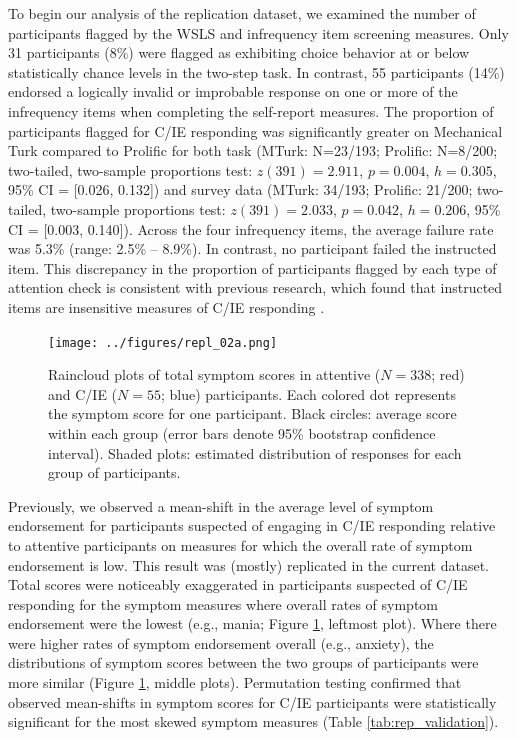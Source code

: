 \documentclass[a4paper,notitlepage,12pt]{article}
\begin{document}
\begin{refsection}[supp]
To begin our analysis of the replication dataset, we examined the number of participants flagged by the WSLS and infrequency item screening measures. Only 31 participants (8\%) were flagged as exhibiting choice behavior at or below statistically chance levels in the two-step task. In contrast, 55 participants (14\%) endorsed a logically invalid or improbable response on one or more of the infrequency items when completing the self-report measures. The proportion of participants flagged for C/IE responding was significantly greater on Mechanical Turk compared to Prolific for both task (MTurk: N=23/193; Prolific: N=8/200; two-tailed, two-sample proportions test: $z(391)=2.911$, $p=0.004$, $h=0.305$, 95\% CI = [0.026, 0.132]) and survey data (MTurk: 34/193; Prolific: 21/200; two-tailed, two-sample proportions test: $z(391)= 2.033$, $p=0.042$, $h=0.206$, 95\% CI = [0.003, 0.140]). Across the four infrequency items, the average failure rate was 5.3\% (range: 2.5\% -- 8.9\%). In contrast, no participant failed the instructed item. This discrepancy in the proportion of participants flagged by each type of attention check is consistent with previous research, which found that instructed items are insensitive measures of C/IE responding \cite{barends2019noncompliant-2, thomas2017validity-2, hauser2016attentive-2}.   

\begin{figure}[t!]
    \texttt{[image: ../figures/repl\_02a.png]}
    \centering
    \captionsetup{width=0.88\textwidth}
    \caption{Raincloud plots of total symptom scores in attentive ($N=338$; red) and C/IE ($N=55$; blue) participants. Each colored dot represents the symptom score for one participant. Black circles: average score within each group (error bars denote 95\% bootstrap confidence interval). Shaded plots: estimated distribution of responses for each group of participants.}
    \label{fig:repl_distributions}
\end{figure}

Previously, we observed a mean-shift in the average level of symptom endorsement for participants suspected of engaging in C/IE responding relative to attentive participants on measures for which the overall rate of symptom endorsement is low. This result was (mostly) replicated in the current dataset. Total scores were noticeably exaggerated in participants suspected of C/IE responding for the symptom measures where overall rates of symptom endorsement were the lowest (e.g., mania; Figure \ref{fig:repl_distributions}, leftmost plot). Where there were higher rates of symptom endorsement overall (e.g., anxiety), the distributions of symptom scores between the two groups of participants were more similar (Figure \ref{fig:repl_distributions}, middle plots). Permutation testing confirmed that observed mean-shifts in symptom scores for C/IE participants were statistically significant for the most skewed symptom measures (Table \ref{tab:rep_validation}).


\end{refsection}
\end{document}
